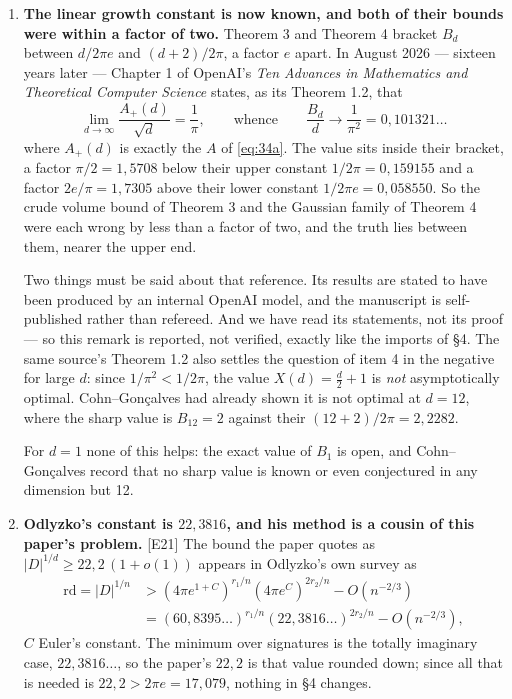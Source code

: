 \documentclass[11pt,reqno]{amsart}
\theoremstyle{plain}
\theoremstyle{definition}
\theoremstyle{remark}
\newcommand{\Ledger}[1]{{\scriptsize\textsf{[#1]}}}
\begin{document}
\begin{enumerate}[leftmargin=1.6em,itemsep=5pt]
\item \textbf{The linear growth constant is now known, and both of their bounds were
  within a factor of two.} Theorem 3 and Theorem 4 bracket $B_d$ between $d/2\pi e$ and
  $(d+2)/2\pi$, a factor $e$ apart. In August 2026 --- sixteen years later --- Chapter 1
  of OpenAI's \emph{Ten Advances in Mathematics and Theoretical Computer Science}
  states, as its Theorem 1.2, that
  \[\lim_{d\to\infty}\frac{A_+(d)}{\sqrt d}=\frac1\pi,\qquad\text{whence}\qquad
    \frac{B_d}{d}\longrightarrow\frac1{\pi^2}=0{,}101321\ldots\]
  where $A_+(d)$ is exactly the $A$ of \eqref{eq:34a}. The value sits inside their
  bracket, a factor $\pi/2=1{,}5708$ below their upper constant $1/2\pi=0{,}159155$ and
  a factor $2e/\pi=1{,}7305$ above their lower constant $1/2\pi e=0{,}058550$. So the
  crude volume bound of Theorem 3 and the Gaussian family of Theorem 4 were each wrong
  by less than a factor of two, and the truth lies between them, nearer the upper end.

  Two things must be said about that reference. Its results are stated to have been
  produced by an internal OpenAI model, and the manuscript is self-published rather
  than refereed. And we have read its statements, not its proof --- so this remark is
  reported, not verified, exactly like the imports of \S4. The same source's Theorem 1.2
  also settles the question of item 4 in the negative for large $d$: since
  $1/\pi^2<1/2\pi$, the value $X(d)=\tfrac d2+1$ is \emph{not} asymptotically optimal.
  Cohn--Gon\c calves had already shown it is not optimal at $d=12$, where the sharp
  value is $B_{12}=2$ against their $(12+2)/2\pi=2{,}2282$.

  For $d=1$ none of this helps: the exact value of $B_1$ is open, and
  Cohn--Gon\c calves record that no sharp value is known or even conjectured in any
  dimension but 12.

\item \textbf{Odlyzko's constant is $22{,}3816$, and his method is a cousin of this
  paper's problem.} \Ledger{E21} The bound the paper quotes as
  $|D|^{1/d}\ge22{,}2\,(1+o(1))$ appears in Odlyzko's own survey as
  \[\begin{aligned}
    \mathrm{rd}=|D|^{1/n}&>(4\pi e^{1+C})^{r_1/n}(4\pi e^{C})^{2r_2/n}-O(n^{-2/3})\\
    &=(60{,}8395\ldots)^{r_1/n}(22{,}3816\ldots)^{2r_2/n}-O(n^{-2/3}),
  \end{aligned}\]
  $C$ Euler's constant. The minimum over signatures is the totally imaginary case,
  $22{,}3816\ldots$, so the paper's $22{,}2$ is that value rounded down; since all that
  is needed is $22{,}2>2\pi e=17{,}079$, nothing in \S4 changes.


\end{enumerate}
\end{document}
